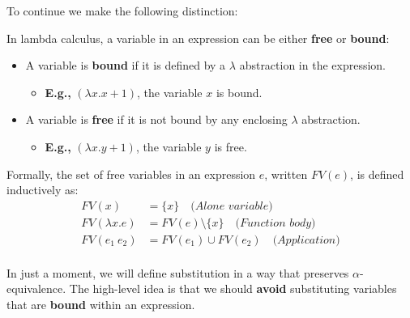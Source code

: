 \noindent
To continue we make the following distinction:
\begin{Def}

    In lambda calculus, a variable in an expression can be either \textbf{free} or \textbf{bound}:
    
    \begin{itemize}
      \item A variable is \textbf{bound} if it is defined by a $\lambda$ abstraction in the expression. 
      \begin{itemize}
        \item \textbf{E.g.,} $(\lambda x. x + 1)$, the variable $x$ is bound.
      \end{itemize}
      \item A variable is \textbf{free} if it is not bound by any enclosing $\lambda$ abstraction.
        \begin{itemize}
            \item \textbf{E.g.,} $(\lambda x. y + 1)$, the variable $y$ is free.
        \end{itemize} 
    \end{itemize}
    
    \noindent
    Formally, the set of free variables in an expression $e$, written $\mathit{FV}(e)$, is defined inductively as:
    \[
    \begin{aligned}
      \mathit{FV}(x) & = \{x\} \quad \textit{(Alone variable)} \\
      \mathit{FV}(\lambda x. e) & = \mathit{FV}(e) \setminus \{x\} \quad \textit{(Function body)}\\
      \mathit{FV}(e_1\ e_2) & = \mathit{FV}(e_1) \cup \mathit{FV}(e_2) \quad \textit{(Application)}\\
    \end{aligned}
    \]
    
    \end{Def}



    \noindent
    In just a moment, we will define substitution in a way that preserves $\alpha$-equivalence. 
    The high-level idea is that we should \textbf{avoid} substituting variables that are \textbf{bound} within an expression.
    
\newpage

